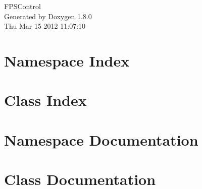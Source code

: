\documentclass{book}
\begin{document}
\hypersetup{pageanchor=false,citecolor=blue}
\begin{titlepage}
\vspace*{7cm}
\begin{center}
{\Large F\-P\-S\-Control }\\
\vspace*{1cm}
{\large Generated by Doxygen 1.8.0}\\
\vspace*{0.5cm}
{\small Thu Mar 15 2012 11:07:10}\\
\end{center}
\end{titlepage}
\clearemptydoublepage
{}
\tableofcontents
\clearemptydoublepage
{}
\hypersetup{pageanchor=true,citecolor=blue}
\chapter{Namespace Index}

\chapter{Class Index}

\chapter{Namespace Documentation}


\chapter{Class Documentation}































\printindex
\end{document}
